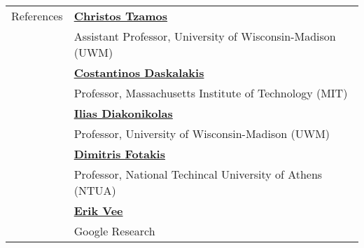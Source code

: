 \documentclass[letterpaper,11pt,oneside]{article}
\begin{document}
\begin{longtable}{@{} l l}
 \Large{References}
 & \href{http://www.tzamos.com}{\textbf{Christos Tzamos}} \\
 & Assistant Professor, University of Wisconsin-Madison (UWM) \\
 & \href{https://people.csail.mit.edu/costis/}{\textbf{Costantinos Daskalakis}} \\ 
 & Professor, Massachusetts Institute of Technology (MIT) \\
 & \href{http://www.iliasdiakonikolas.org}{\textbf{Ilias Diakonikolas}} \\
 & Professor, University of Wisconsin-Madison (UWM) \\
 & \href{http://www.fotakis.cs.ntua.gr}{\textbf{Dimitris Fotakis}} \\
 & Professor, National Techincal University of Athens (NTUA) \\
 & \href{https://scholar.google.com/citations?user=1u8drP0AAAAJ&hl=en
}{\textbf{Erik Vee}} \\
 & Google Research \\
\end{longtable}
\end{document}
